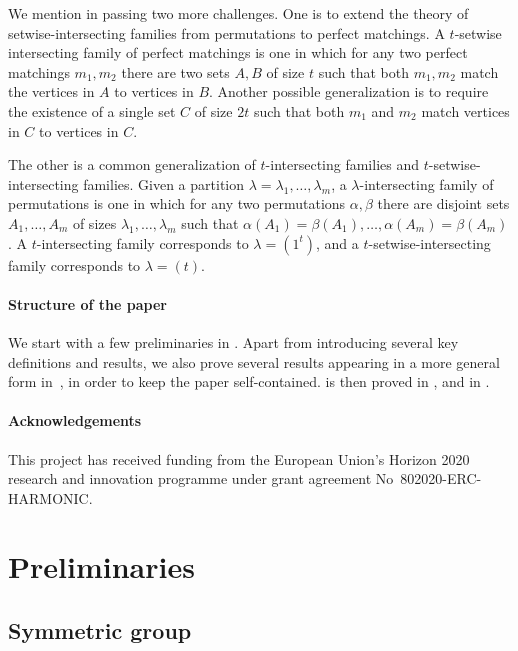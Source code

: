 \documentclass{article}
\theoremstyle{definition}
\begin{document}
\smallskip

We mention in passing two more challenges. One is to extend the theory of setwise-intersecting families from permutations to perfect matchings. A $t$-setwise intersecting family of perfect matchings is one in which for any two perfect matchings $m_1,m_2$ there are two sets $A,B$ of size $t$ such that both $m_1,m_2$ match the vertices in $A$ to vertices in $B$. Another possible generalization is to require the existence of a single set $C$ of size $2t$ such that both $m_1$ and $m_2$ match vertices in $C$ to vertices in $C$.

The other is a common generalization of $t$-intersecting families and $t$-setwise-intersecting families. Given a partition $\lambda = \lambda_1,\ldots,\lambda_m$, a $\lambda$-intersecting family of permutations is one in which for any two permutations $\alpha,\beta$ there are disjoint sets $A_1,\ldots,A_m$ of sizes $\lambda_1,\ldots,\lambda_m$ such that $\alpha(A_1) = \beta(A_1),\ldots,\alpha(A_m)=\beta(A_m)$. A $t$-intersecting family corresponds to $\lambda = (1^t)$, and a $t$-setwise-intersecting family corresponds to $\lambda = (t)$.

\paragraph{Structure of the paper} We start with a few preliminaries in . Apart from introducing several key definitions and results, we also prove several results appearing in a more general form in~\cite{DFLLV}, in order to keep the paper self-contained.  is then proved in , and  in .

\paragraph{Acknowledgements} This project has received funding from the European Union's Horizon 2020 research and innovation programme under grant agreement No~802020-ERC-HARMONIC.

\section{Preliminaries} \label{sec:prel}

\subsection{Symmetric group} \label{sec:prel-sym}
\end{document}
